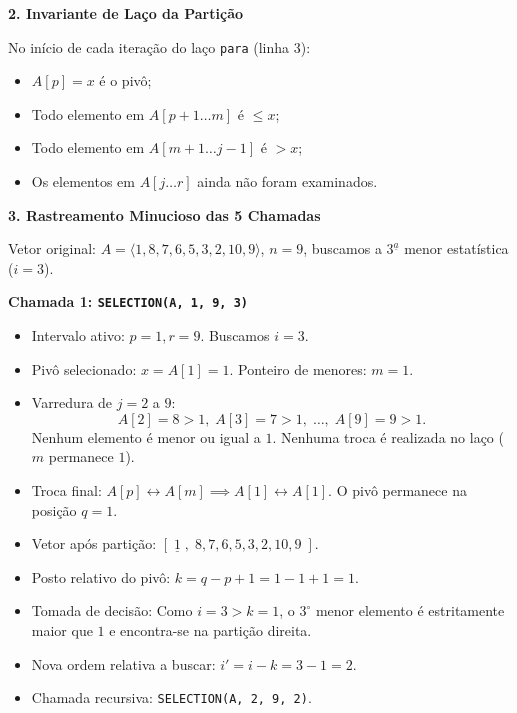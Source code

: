 \documentclass[11pt,a4paper]{article}
\newcommand{\topico}[1]{\par\medskip\textbf{\color{azul}#1}\par}
\newcommand{\destaque}[1]{\textbf{\color{azul}#1}}
\begin{document}
\topico{2. Invariante de Laço da Partição}
No início de cada iteração do laço \texttt{para} (linha 3):
\begin{itemize}
    \item $A[p] = x$ é o pivô;
    \item Todo elemento em $A[p+1 \dots m]$ é $\le x$;
    \item Todo elemento em $A[m+1 \dots j-1]$ é $> x$;
    \item Os elementos em $A[j \dots r]$ ainda não foram examinados.
\end{itemize}

\topico{3. Rastreamento Minucioso das 5 Chamadas}
Vetor original: $A = \langle 1, 8, 7, 6, 5, 3, 2, 10, 9 \rangle$, $n = 9$, buscamos a $3^{\underline{a}}$ menor estatística ($i = 3$).

\vspace{4pt}
\destaque{Chamada 1: \texttt{SELECTION(A, 1, 9, 3)}}
\begin{itemize}
    \item Intervalo ativo: $p = 1, r = 9$. Buscamos $i = 3$.
    \item Pivô selecionado: $x = A[1] = 1$. Ponteiro de menores: $m = 1$.
    \item Varredura de $j = 2$ a $9$:
    \[
    A[2]=8 > 1, \; A[3]=7 > 1, \; \dots, \; A[9]=9 > 1.
    \]
    Nenhum elemento é menor ou igual a $1$. Nenhuma troca é realizada no laço ($m$ permanece $1$).
    \item Troca final: $A[p] \leftrightarrow A[m] \implies A[1] \leftrightarrow A[1]$. O pivô permanece na posição $q = 1$.
    \item Vetor após partição: $[\;\underline{1}\;, \; 8, 7, 6, 5, 3, 2, 10, 9\;]$.
    \item Posto relativo do pivô: $k = q - p + 1 = 1 - 1 + 1 = 1$.
    \item Tomada de decisão: Como $i = 3 > k = 1$, o $3^\circ$ menor elemento é estritamente maior que $1$ e encontra-se na partição direita.
    \item Nova ordem relativa a buscar: $i' = i - k = 3 - 1 = 2$.
    \item Chamada recursiva: \texttt{SELECTION(A, 2, 9, 2)}.
\end{itemize}
\end{document}
